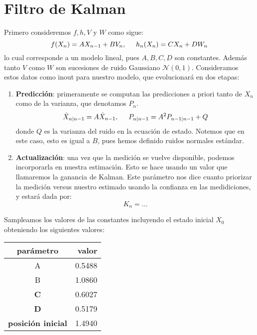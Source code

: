 \documentclass[letterpaper,11pt,oneside]{article}
\begin{document}
\section{Filtro de Kalman}
Primero consideremos $f,h,V$ y $W$ como sigue:
$$ f(X_n) = A X_{n-1} + B V_n ,\hspace{.5cm} h_n(X_n) = C X_n + DW_n$$
lo cual corresponde a un modelo lineal, pues $A,B,C,D$ son constantes. Además tanto $V$ como $W$ son sucesiones de ruido Gaussiano $\mathcal{N}(0,1)$. Consideramos estos datos como inout para nuestro modelo, que evolucionará en dos etapas:
\begin{enumerate}
    \item \textbf{Predicción}: primeramente se computan las predicciones a priori tanto de $X_n$ como de la varianza, que denotamos $P_n$.
    $$ \hat X_{n|n-1} = A \hat X_{n-1},\hspace{.5cm} P_{n|n-1} = A^2 P_{n-1|n-1} + Q$$
    donde $Q$ es la varianza del ruido en la ecuación de estado. Notemos que en este caso, esto es igual a $B$, pues hemos definido ruidos normales estándar.
    \item \textbf{Actualización}: una vez que la medición se vuelve disponible, podemos incorporarla en nuestra estimación. Esto se hace usando un valor que llamaremos la ganancia de Kalman. Este parámetro nos dice cuanto priorizar la medición versus nuestro estimado usando la confianza en las medidiciones, y estará dada por:
    $$ K_n = \dots$$
\end{enumerate}

\newp Sampleamos los valores de las constantes incluyendo el estado inicial $X_0$ obteniendo los siguientes valores:

\begin{table}
\begin{tabular}{|c|l|}
\hline
\textbf{parámetro}        & \multicolumn{1}{r|}{\textbf{valor}} \\ \hline
A                         & \multicolumn{1}{r|}{0.5488}         \\ \hline
B                         & \multicolumn{1}{r|}{1.0860}         \\ \hline
\textbf{C}                & 0.6027                              \\ \hline
\textbf{D}                & 0.5179                              \\ \hline
\textbf{posición inicial} & 1.4940                              \\ \hline
\end{tabular}
\end{table}
\end{document}
